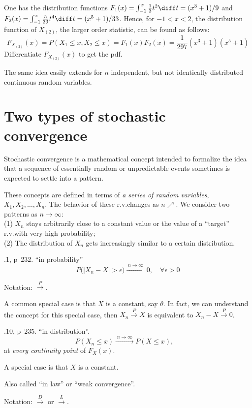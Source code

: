 \documentclass[12pt]{article}
\begin{document}
One has the distribution functions
$F_1(x) = \int_{-1}^x \frac{1}{3} t^2\diff t = (x^3 + 1)/9$ and
$F_2(x) = \int_{-1}^x \frac{5}{33}t^4\diff t = (x^5 + 1)/33$.
Hence, for $-1<x<2$, the distribution function of $X_{(2)}$,
the larger order statistic, can be found as follows:
\[
F_{X_{(2)}}(x)
= P(X_1 \le x, X_2 \le x)
= F_1(x) F_2(x)
= \frac{1}{297}(x^3+1)(x^5+1)
\]
Differentiate $F_{X_{(2)}}(x)$ to get the pdf.

The same idea easily extends for $n$ independent, but not identically
distributed continuous random variables.



\section{Two types of stochastic convergence}

Stochastic convergence is a mathematical concept intended to formalize
the idea that a sequence of essentially random or unpredictable events
sometimes is expected to settle into a pattern.

These concepts are defined in terms of \emph{a series of random
variables}, $X_1,X_2,\dotsc,X_n$.
The behavior of these r.v.\@ changes as $n\nearrow$.
We consider two patterns as $n\to \infty$:\\
(1) $X_n$ stays arbitrarily close to a constant value 
or the value of a ``target'' r.v.\@ with very high
probability;\\
(2) The distribution of $X_n$ gets increasingly similar to a certain
distribution.

.1, p~232. ``in probability''
\[
P\bigl(|X_n - X| > \epsilon\bigr)
\xrightarrow{\;n\to\infty\;} 0,
\quad
\forall \epsilon > 0
\]

Notation: $\xrightarrow{\;P\;}$.

A common special case is that $X$ is a constant, say $\theta$.
In fact, we can understand the concept for this special case,
then $X_n \xrightarrow{\;P\;} X$ is equivalent to
$X_n - X \xrightarrow{\;P\;} 0$.

.10, p~235. ``in distribution''.
\[
P(X_n \le x) \xrightarrow{\;n\to\infty\;}
P(X \le x),
\quad
\]
at \emph{every continuity point} of $F_X(x)$.

A special case is that $X$ is a constant.

Also called ``in law'' or ``weak convergence''.

Notation: $\xrightarrow{\;D\;}$ or
$\xrightarrow{\;L\;}$.
\end{document}
